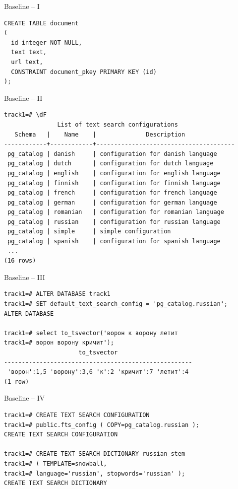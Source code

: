 \documentclass{beamer}
\begin{document}
\begin{frame}[fragile]{Baseline -- I}
\begin{verbatim}
CREATE TABLE document
(
  id integer NOT NULL,
  text text,
  url text,
  CONSTRAINT document_pkey PRIMARY KEY (id)
);
\end{verbatim}
\end{frame}

\begin{frame}[fragile]{Baseline -- II}
\begin{footnotesize}
\begin{verbatim}
track1=# \dF
               List of text search configurations
   Schema   |    Name    |              Description
------------+------------+---------------------------------------
 pg_catalog | danish     | configuration for danish language
 pg_catalog | dutch      | configuration for dutch language
 pg_catalog | english    | configuration for english language
 pg_catalog | finnish    | configuration for finnish language
 pg_catalog | french     | configuration for french language
 pg_catalog | german     | configuration for german language
 pg_catalog | romanian   | configuration for romanian language
 pg_catalog | russian    | configuration for russian language
 pg_catalog | simple     | simple configuration
 pg_catalog | spanish    | configuration for spanish language
 ...
(16 rows)
\end{verbatim}
\end{footnotesize}
\end{frame}

\begin{frame}[fragile]{Baseline -- III}
\begin{footnotesize}
\begin{verbatim}
track1=# ALTER DATABASE track1 
track1=# SET default_text_search_config = 'pg_catalog.russian';
ALTER DATABASE

track1=# select to_tsvector('ворон к ворону летит 
track1=# ворон ворону кричит');
                     to_tsvector
-----------------------------------------------------
 'ворон':1,5 'ворону':3,6 'к':2 'кричит':7 'летит':4
(1 row)
\end{verbatim}
\end{footnotesize}
\end{frame}

\begin{frame}[fragile]{Baseline -- IV}
\begin{footnotesize}
\begin{verbatim}
track1=# CREATE TEXT SEARCH CONFIGURATION 
track1=# public.fts_config ( COPY=pg_catalog.russian );
CREATE TEXT SEARCH CONFIGURATION

track1=# CREATE TEXT SEARCH DICTIONARY russian_stem 
track1=# ( TEMPLATE=snowball, 
track1=# language='russian', stopwords='russian' );
CREATE TEXT SEARCH DICTIONARY
\end{verbatim}
\end{footnotesize}
\end{frame}
\end{document}
